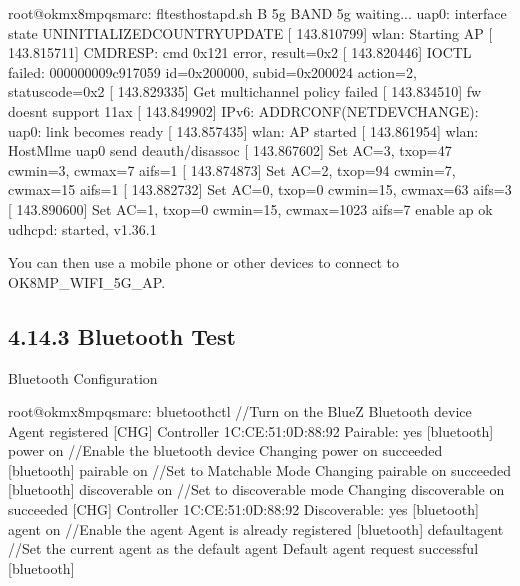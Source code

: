 \documentclass[letterpaper,10pt,openany,english]{sphinxmanual}
\begin{document}
\begin{sphinxVerbatim}[commandchars=\\\{\}]
root@ok\PYGZhy{}mx8mpq\PYGZhy{}smarc:\PYGZti{}\PYGZsh{} fltest\PYGZus{}hostapd.sh \PYGZhy{}B 5g
BAND 5g
waiting...
uap0: interface state UNINITIALIZED\PYGZhy{}\PYGZgt{}COUNTRY\PYGZus{}UPDATE
[  143.810799] wlan: Starting AP
[  143.815711] CMD\PYGZus{}RESP: cmd 0x121 error, result=0x2
[  143.820446] IOCTL failed: 000000009c917059 id=0x200000, sub\PYGZus{}id=0x200024 action=2, status\PYGZus{}code=0x2
[  143.829335] Get multi\PYGZhy{}channel policy failed
[  143.834510] fw doesn\PYGZsq{}t support 11ax
[  143.849902] IPv6: ADDRCONF(NETDEV\PYGZus{}CHANGE): uap0: link becomes ready
[  143.857435] wlan: AP started
[  143.861954] wlan: HostMlme uap0 send deauth/disassoc
[  143.867602] Set AC=3, txop=47 cwmin=3, cwmax=7 aifs=1
[  143.874873] Set AC=2, txop=94 cwmin=7, cwmax=15 aifs=1
[  143.882732] Set AC=0, txop=0 cwmin=15, cwmax=63 aifs=3
[  143.890600] Set AC=1, txop=0 cwmin=15, cwmax=1023 aifs=7
enable ap ok
udhcpd: started, v1.36.1
\end{sphinxVerbatim}

\sphinxAtStartPar
You can then use a mobile phone or other devices to connect to OK8MP\_WIFI\_5G\_AP.


\subsection{4.14.3 Bluetooth Test}
\label{\detokenize{linux-manual:bluetooth-test}}
\sphinxAtStartPar
Bluetooth Configuration

\begin{sphinxVerbatim}[commandchars=\\\{\}]
root@ok\PYGZhy{}mx8mpq\PYGZhy{}smarc:\PYGZti{}\PYGZsh{} bluetoothctl                  //Turn on the BlueZ Bluetooth device           
Agent registered
[CHG] Controller 1C:CE:51:0D:88:92 Pairable: yes
[bluetooth]\PYGZsh{} power on          //Enable the bluetooth device
Changing power on succeeded
[bluetooth]\PYGZsh{} pairable on       //Set to Matchable Mode
Changing pairable on succeeded
[bluetooth]\PYGZsh{} discoverable on   //Set to discoverable mode
Changing discoverable on succeeded
[CHG] Controller 1C:CE:51:0D:88:92 Discoverable: yes
[bluetooth]\PYGZsh{} agent on        //Enable the agent
Agent is already registered
[bluetooth]\PYGZsh{} default\PYGZhy{}agent    //Set the current agent as the default agent
Default agent request successful
[bluetooth]\PYGZsh{}
\end{sphinxVerbatim}
\end{document}

